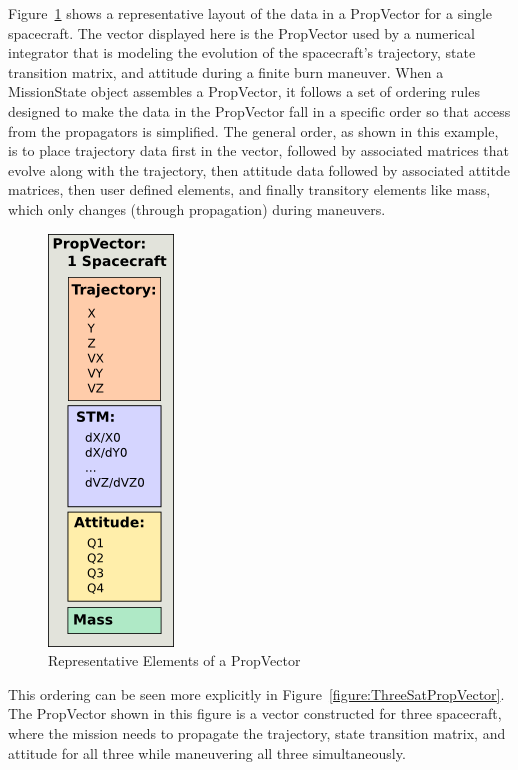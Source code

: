 Figure~\ref{figure:PropVectorComponents} shows a representative layout of the data in a PropVector
for a single spacecraft.  The vector displayed here is the PropVector used by a numerical
integrator that is modeling the evolution of the spacecraft's trajectory, state transition matrix,
and attitude during a finite burn maneuver.  When a MissionState object assembles a PropVector, it
follows a set of ordering rules designed to make the data in the PropVector fall in a specific
order so that access from the propagators is simplified.  The general order, as shown in this
example, is to place trajectory data first in the vector, followed by associated matrices that
evolve along with the trajectory, then attitude data followed by associated attitde matrices, then
user defined elements, and finally transitory elements like mass, which only changes (through
propagation) during maneuvers.

\begin{figure}[htb]
\begin{center}
\includegraphics[63,207]{Images/PropVectorComponents.png}
\caption{\label{figure:PropVectorComponents}Representative Elements of a PropVector}
\end{center}
\end{figure}

This ordering can be seen more explicitly in Figure~\ref{figure:ThreeSatPropVector}.  The
PropVector shown in this figure is a vector constructed for three spacecraft, where the mission
needs to propagate the trajectory, state transition matrix, and attitude for all three while
maneuvering all three simultaneously.


